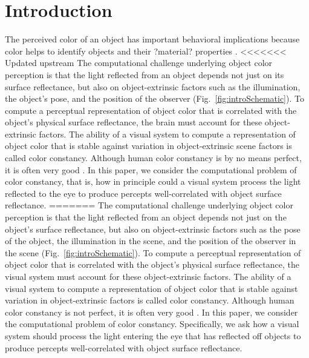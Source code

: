 \documentclass{jov}
\begin{document}

\maketitle

\section{Introduction}
The perceived color of an object has important behavioral implications because color helps to identify objects and their ?material? properties \cite{Mollon89, Jacobs81}.
<<<<<<< Updated upstream
The computational challenge underlying object color perception is that the light reflected from an object depends not just on its surface reflectance, but also on object-extrinsic factors such as the illumination, the object's pose, and the position of the observer (Fig.~\ref{fig:introSchematic}).
To compute a perceptual representation of object color that is correlated with the object's physical surface reflectance, the brain must account for these object-extrinsic factors.
The ability of a visual system to compute a representation of object color that is stable against variation in object-extrinsic scene factors is called color constancy. 
Although human color constancy is by no means perfect, it is often very good \cite{FosterColorConstancy, BrainardColorConstancy}. 
In this paper, we consider the computational problem of color constancy, that is, how in principle could a visual system process the light reflected to the eye to produce percepts well-correlated with object surface reflectance.
=======
The computational challenge underlying object color perception is that the light reflected from an object depends not just on the object's surface reflectance, but also 
on object-extrinsic factors such as the pose of the object, the illumination in the scene, and the position of the observer in the scene (Fig.~\ref{fig:introSchematic}).
To compute a perceptual representation of object color that is correlated with the object's physical surface reflectance, the visual system must account for these object-extrinsic factors.
The ability of a visual system to compute a representation of object color that is stable against variation in object-extrinsic factors is called color constancy. 
Although human color constancy is not perfect, it is often very good \cite{FosterColorConstancy, BrainardColorConstancy}. 
In this paper, we consider the computational problem of color constancy. Specifically, we ask how a visual system should process the light entering the eye that has reflected off objects to produce percepts well-correlated with object surface reflectance.
\end{document}
